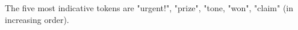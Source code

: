 \begin{answer}
The five most indicative tokens are "urgent!", "prize", "tone, "won", "claim" (in increasing order). \\
\end{answer}
